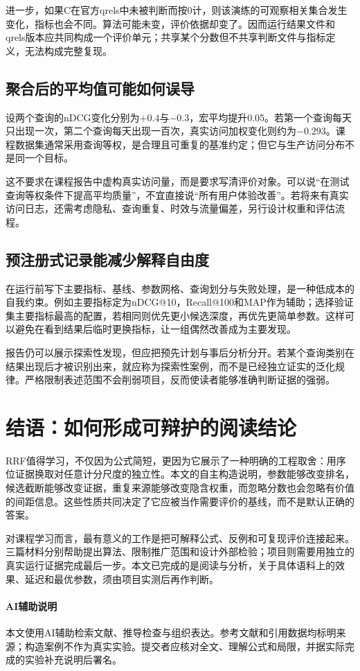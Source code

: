 \documentclass[sigconf,nonacm]{acmart}
\begin{document}
进一步，如果C在官方qrels中未被判断而按0计，则该演练的可观察相关集合发生变化，指标也会不同。算法可能未变，评价依据却变了。因而运行结果文件和qrels版本应共同构成一个评价单元；共享某个分数但不共享判断文件与指标定义，无法构成完整复现。

\subsection{聚合后的平均值可能如何误导}
设两个查询的nDCG变化分别为$+0.4$与$-0.3$，宏平均提升0.05。若第一个查询每天只出现一次，第二个查询每天出现一百次，真实访问加权变化则约为$-0.293$。课程数据集通常采用查询等权，是合理且可重复的基准约定；但它与生产访问分布不是同一个目标。

这不要求在课程报告中虚构真实访问量，而是要求写清评价对象。可以说“在测试查询等权条件下提高平均质量”，不宜直接说“所有用户体验改善”。若将来有真实访问日志，还需考虑隐私、查询重复、时效与流量偏差，另行设计权重和评估流程。

\subsection{预注册式记录能减少解释自由度}
在运行前写下主要指标、基线、参数网格、查询划分与失败处理，是一种低成本的自我约束。例如主要指标定为nDCG@10，Recall@100和MAP作为辅助；选择验证集主要指标最高的配置，若相同则优先更小候选深度，再优先更简单参数。这样可以避免在看到结果后临时更换指标，让一组偶然改善成为主要发现。

报告仍可以展示探索性发现，但应把预先计划与事后分析分开。若某个查询类别在结果出现后才被识别出来，就应称为探索性案例，而不是已经独立证实的泛化规律。严格限制表述范围不会削弱项目，反而使读者能够准确判断证据的强弱。

\section{结语：如何形成可辩护的阅读结论}
RRF值得学习，不仅因为公式简短，更因为它展示了一种明确的工程取舍：用序位证据换取对任意计分尺度的独立性。本文的自主构造说明，参数能够改变排名，候选截断能够改变证据，重复来源能够改变隐含权重，而忽略分数也会忽略有价值的间距信息。这些性质共同决定了它应被当作需要评价的基线，而不是默认正确的答案。

对课程学习而言，最有意义的工作是把可解释公式、反例和可复现评价连接起来。三篇材料分别帮助提出算法、限制推广范围和设计外部检验；项目则需要用独立的真实运行证据完成最后一步。本文已完成的是阅读与分析，关于具体语料上的效果、延迟和最优参数，须由项目实测后再作判断。

\paragraph{AI辅助说明}
本文使用AI辅助检索文献、推导检查与组织表达。参考文献和引用数据均标明来源；构造案例不作为真实实验。提交者应核对全文、理解公式和局限，并据实际完成的实验补充说明后署名。



\end{document}
